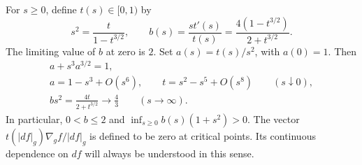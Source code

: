 For $s\geq0$, define $t(s)\in[0,1)$ by
\begin{equation}\label{str-pde-law}
 s^2=\frac{t}{1-t^{3/2}},\qquad
 b(s)=\frac{s t'(s)}{t(s)}
      =\frac{4(1-t^{3/2})}{2+t^{3/2}}.
\end{equation}
The limiting value of $b$ at zero is $2$. Set
$a(s)=t(s)/s^2$, with $a(0)=1$. Then
\begin{equation}\label{str-pde-law-limits}
\begin{gathered}
 a+s^3a^{3/2}=1,\\
 a=1-s^3+O(s^6),\qquad t=s^2-s^5+O(s^8)
       \qquad(s\downarrow0),\\
 b s^2=\frac{4t}{2+t^{3/2}}\longrightarrow\frac43
       \qquad(s\longrightarrow\infty).
\end{gathered}
\end{equation}
In particular, $0<b\leq2$ and
$\inf_{s\geq0}b(s)(1+s^2)>0$.
The vector $t(|df|_g)\nabla_g f/|df|_g$ is defined to be zero at
critical points. Its continuous dependence on $df$ will always be
understood in this sense.

